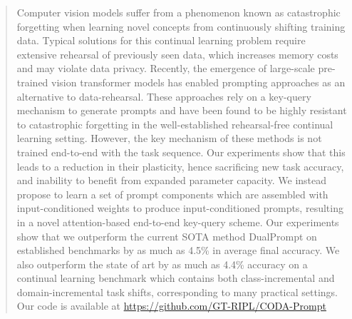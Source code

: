 \begin{abstract}
    Computer vision models suffer from a phenomenon known as catastrophic forgetting when learning novel concepts from continuously shifting training data. Typical solutions for this continual learning problem require extensive rehearsal of previously seen data, which increases memory costs and may violate data privacy. Recently, the emergence of large-scale pre-trained vision transformer models has enabled prompting approaches as an alternative to data-rehearsal. These approaches rely on a key-query mechanism to generate prompts and have been found to be highly resistant to catastrophic forgetting in the well-established rehearsal-free continual learning setting. However, the key mechanism of these methods is not trained end-to-end with the task sequence. Our experiments show that this leads to a reduction in their plasticity, hence sacrificing new task accuracy, and inability to benefit from expanded parameter capacity. We instead propose to learn a set of prompt components which are assembled with input-conditioned weights to produce input-conditioned prompts, resulting in a novel attention-based end-to-end key-query scheme. Our experiments show that we outperform the current SOTA method DualPrompt on established benchmarks by as much as 4.5\% in average final accuracy. We also outperform the state of art by as much as 4.4\% accuracy on a continual learning benchmark which contains both class-incremental and domain-incremental task shifts, corresponding to many practical settings. Our code is available at \footnotesize{\url{https://github.com/GT-RIPL/CODA-Prompt}}
\end{abstract}

